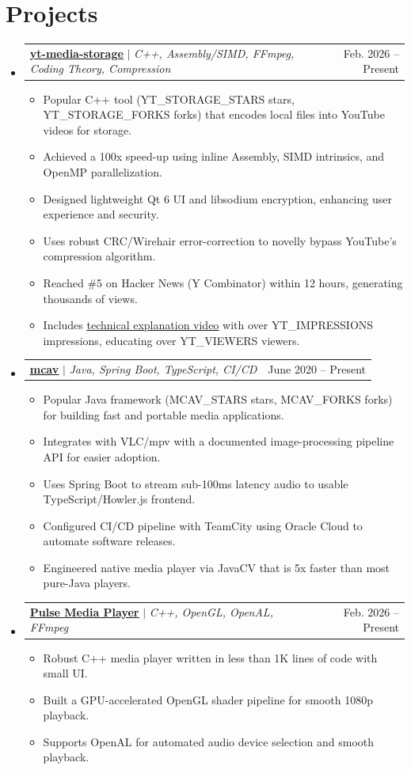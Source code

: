 \documentclass[letterpaper,11pt]{article}
\makeatletter
\let\oldhref\href
\renewcommand{\href}[2]{\oldhref{#1}{\uline{#2}}}
\newcommand{\resumeItem}[1]{
    \item\small{
            {#1 \vspace{-2pt}}
    }
}
\newcommand{\resumeProjectHeading}[2]{
    \item
    \begin{tabular*}{0.97\textwidth}{l@{\extracolsep{\fill}}r}
    \small#1 & #2 \\
    \end{tabular*}\vspace{-7pt}
}
\newcommand{\resumeSubHeadingListStart}{\begin{itemize}[leftmargin=0.15in, label={}]}
\newcommand{\resumeSubHeadingListEnd}{\end{itemize}}
\newcommand{\resumeItemListStart}{\begin{itemize}}
\newcommand{\resumeItemListEnd}{\end{itemize}\vspace{-5pt}}
\makeatother
\begin{document}
    \section{Projects}
    \resumeSubHeadingListStart
    \resumeProjectHeading
    {\href{https://github.com/PulseBeat02/yt-media-storage}{\textbf{yt-media-storage}} $|$ \emph{C++, Assembly/SIMD, FFmpeg, Coding Theory, Compression}}{Feb. 2026 -- Present}
    \resumeItemListStart
    \resumeItem{Popular C++ tool ({{YT_STORAGE_STARS}} stars, {{YT_STORAGE_FORKS}} forks) that encodes local files into YouTube videos for storage.}
    \resumeItem{Achieved a 100x speed-up using inline Assembly, SIMD intrinsics, and OpenMP parallelization.}
    \resumeItem{Designed lightweight Qt 6 UI and libsodium encryption, enhancing user experience and security.}
    \resumeItem{Uses robust CRC/Wirehair error-correction to novelly bypass YouTube's compression algorithm.}
    \resumeItem{Reached \#5 on Hacker News (Y Combinator) within 12 hours, generating thousands of views.}
    \resumeItem{Includes \href{https://www.youtube.com/watch?v=l03Os5uwWmk}{technical explanation video} with over {{YT_IMPRESSIONS}} impressions, educating over {{YT_VIEWERS}} viewers.}
    \resumeItemListEnd
    \vspace{1mm}
    \resumeProjectHeading
    {\href{https://github.com/PulseBeat02/mcav}{\textbf{mcav}} $|$ \emph{Java, Spring Boot, TypeScript, CI/CD}}{June 2020 -- Present}
    \resumeItemListStart
    \resumeItem{Popular Java framework ({{MCAV_STARS}} stars, {{MCAV_FORKS}} forks) for building fast and portable media applications.}
    \resumeItem{Integrates with VLC/mpv with a documented image-processing pipeline API for easier adoption.}
    \resumeItem{Uses Spring Boot to stream sub-100ms latency audio to usable TypeScript/Howler.js frontend.}
    \resumeItem{Configured CI/CD pipeline with TeamCity using Oracle Cloud to automate software releases.}
    \resumeItem{Engineered native media player via JavaCV that is 5x faster than most pure-Java players.}
    \resumeItemListEnd
    \vspace{1mm}
    \resumeProjectHeading
    {\href{https://github.com/PulseBeat02/video-player}{\textbf{Pulse Media Player}} $|$ \emph{C++, OpenGL, OpenAL, FFmpeg}}{Feb. 2026 -- Present}
    \resumeItemListStart
    \resumeItem{Robust C++ media player written in less than 1K lines of code with small UI.}
    \resumeItem{Built a GPU-accelerated OpenGL shader pipeline for smooth 1080p playback.}
    \resumeItem{Supports OpenAL for automated audio device selection and smooth playback.}
    \resumeItemListEnd
    \vspace{1mm}
    \resumeSubHeadingListEnd
\end{document}
